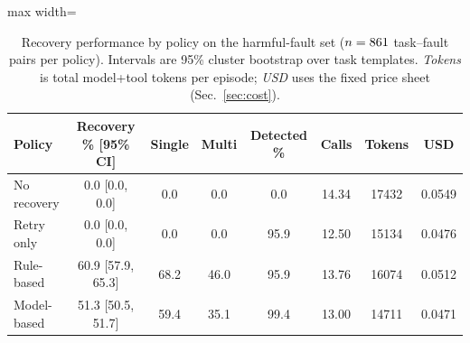 \begin{table}[t]
\centering\small
\caption{Recovery performance by policy on the harmful-fault set
($n=861$ task--fault pairs per policy). Intervals are 95\% cluster
bootstrap over task templates. \emph{Tokens} is total model+tool tokens per
episode; \emph{USD} uses the fixed price sheet (Sec.~\ref{sec:cost}).}
\label{tab:main}
\begin{adjustbox}{max width=\textwidth}
\begin{tabular}{@{}lccccccc@{}}
\toprule
Policy & Recovery \% [95\% CI] & Single & Multi & Detected \% & Calls & Tokens & USD \\
\midrule
No recovery & 0.0 [0.0, 0.0] & 0.0 & 0.0 & 0.0 & 14.34 & 17432 & 0.0549 \\
Retry only & 0.0 [0.0, 0.0] & 0.0 & 0.0 & 95.9 & 12.50 & 15134 & 0.0476 \\
Rule-based & 60.9 [57.9, 65.3] & 68.2 & 46.0 & 95.9 & 13.76 & 16074 & 0.0512 \\
Model-based & 51.3 [50.5, 51.7] & 59.4 & 35.1 & 99.4 & 13.00 & 14711 & 0.0471 \\
\bottomrule
\end{tabular}
\end{adjustbox}
\end{table}
